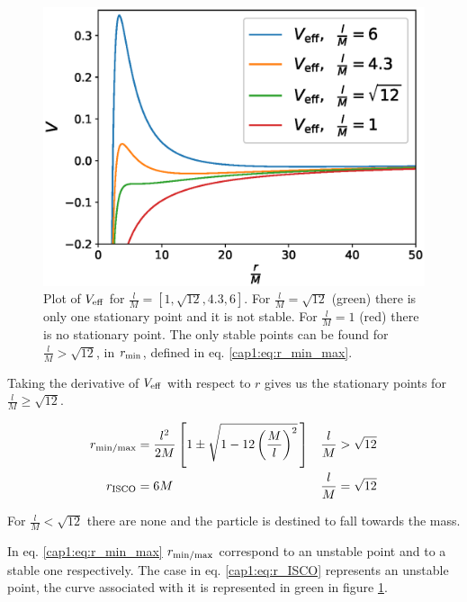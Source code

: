 \begin{figure}[h]
\begin{minipage}{0.49 \textwidth}
    \includegraphics[width = \textwidth]{Figures/V_eff_tanti.eps}
    \caption{Plot of $V_{\rm eff}$ for $\frac{l}{M} = [1, \sqrt{12}, 4.3, 6]$.
    For $\frac{l}{M} = \sqrt{12}$ (green) there is only one stationary point
    and it is not stable.
    For $\frac{l}{M} = 1$ (red) there is no stationary point.
    The only stable points can be found for $\frac{l}{M} > \sqrt{12}$,
    in $r_{\rm min}$, defined in eq. \ref{cap1:eq:r_min_max}.}
    \label{cap1:fig:V_eff_tanti}
\end{minipage}
\end{figure}

Taking the derivative of $V_{\rm eff}$ with respect to $r$ gives us the stationary
points for $\frac{l}{M} \geq \sqrt{12}$.

\begin{subequations}
\begin{align}
    r_{\rm min / max} &= \frac{l^2}{2 M} \left[1 \pm
    \sqrt{1 - 12 \left( \frac{M}{l} \right)^2} \, \right]
    &&\frac{l}{M} > \sqrt{12} \label{cap1:eq:r_min_max} \\
    r_{\rm ISCO} &= 6 M
    &&\frac{l}{M} = \sqrt{12} \label{cap1:eq:r_ISCO}
\end{align}
\label{cap1:eq:stationary_r}
\end{subequations}

For $\frac{l}{M} < \sqrt{12}$ there are none and the particle is destined
to fall towards the mass.

In eq. \ref{cap1:eq:r_min_max} $r_{\rm min/max}$ correspond to an unstable point and to a stable
one respectively.
The case in eq. \ref{cap1:eq:r_ISCO} represents an unstable point, the curve
associated with it is represented in green in figure
\ref{cap1:fig:V_eff_tanti}.

